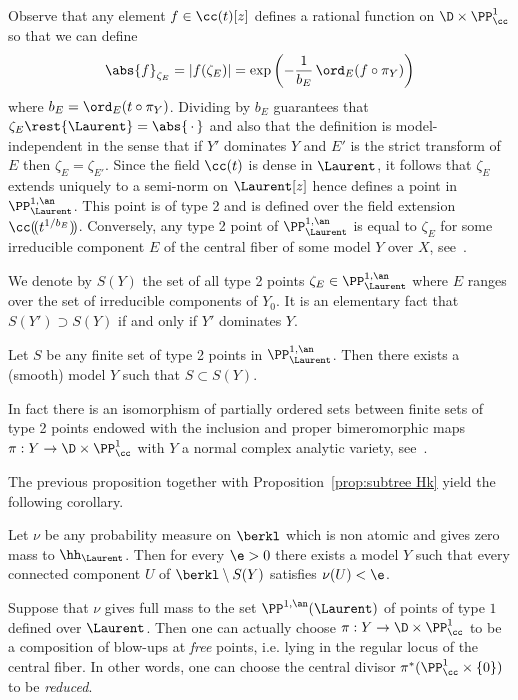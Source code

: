 Observe that any element $f\in \cc(t)[z]$ defines a rational function on $\D \times \PP^1_\cc$ so that we can define
\[
\abs{f}_{\zeta_E} = |f(\zeta_E)| = \exp \left(- \frac1{b_E}\, \ord_E(f \circ \pi_Y)\right)
\]
where $b_E = \ord_E (t \circ \pi_Y)$. Dividing by $b_E$ guarantees that $\zeta_E\rest{\Laurent} = \abs{{\,\cdot\,}}$ and also that the definition is model-independent in the sense that if $Y'$ dominates $Y$ and $E'$ is the strict transform of $E$ then $\zeta_E=\zeta_{E'}$. Since the field $\cc(t)$ is dense in $\Laurent$, it follows that $\zeta_E$ extends uniquely to a semi-norm on $\Laurent[z]$ hence defines a point in $\PP^{1,\an}_{\Laurent}$. This point is of type 2 and is defined over the field extension $\cc(\!(t^{1/{b_E}})\!)$. Conversely, any type 2 point of $\PP^{1,\an}_{\Laurent}$ is equal to $\zeta_E$ for some irreducible component $E$ of the central fiber of some model $Y$ over $X$, see~\cite[Lem.~7.16]{NL}.

We denote by $ S(Y)$ the set of all type 2 points $\zeta_E \in \PP^{1,\an}_{\Laurent}$ where $E$ ranges over the set of irreducible components of $Y_0$. It is an elementary fact that $S(Y') \supset S(Y)$ if and only if $Y'$ dominates $Y$.

\begin{prop}
Let $S$ be any finite set of type 2 points in $\PP^{1,\an}_{\Laurent}$. Then there exists a (smooth) model $Y$ such that $S \subset S(Y)$.
\end{prop}

\begin{rema}
In fact there is an isomorphism of partially ordered sets between finite sets of type 2 points endowed with the inclusion and proper bimeromorphic maps $\pi: Y \to \D \times \PP^1_\cc$ with $Y$ a normal complex analytic variety, see~\cite[Thm.~7.18]{NL}.
\end{rema}

The previous proposition together with Proposition~\ref{prop:subtree Hk} yield the following corollary.

\begin{coro}\label{cor:cut to small}
Let $\nu$ be any probability measure on $\berkl$ which is non atomic and gives zero mass to $\hh_\Laurent$. Then for every $\e>0$ there exists a model $Y$ such that every connected component $U$ of $\berkl\setminus S(Y)$ satisfies $\nu(U)<\e$.
\end{coro}

\begin{rema}\label{rem:useless}
Suppose that $\nu$ gives full mass to the set $\PP^{1,\an}(\Laurent)$ of points of type $1$ defined over $\Laurent$. Then one can actually choose $\pi: Y \to \D\times \PP^{1}_\cc $ to be a composition of blow-ups at \emph{free} points, i.e. lying in the regular locus of the central fiber. In other words, one can choose the central divisor $\pi^* (\PP^{1}_\cc \times \{ 0 \})$ to be \emph{reduced}.
\end{rema}

